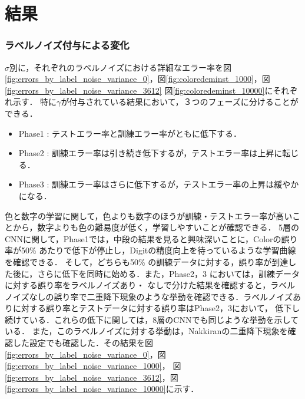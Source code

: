 \chapter{結果}
\label{chap:results}

\subsection{ラベルノイズ付与による変化}
$\sigma$別に，それぞれのラベルノイズにおける詳細なエラー率を図\ref{fig:errors_by_label_noise_variance_0}，図\ref{fig:coloredeminst_1000}，図\ref{fig:errors_by_label_noise_variance_3612}
図\ref{fig:coloredeminst_10000}にそれぞれ示す．
特に$\gamma$が付与されている結果において，３つのフェーズに分けることができる．
\begin{itemize}
    \item Phase1 : テストエラー率と訓練エラー率がともに低下する．
    \item Phase2 : 訓練エラー率は引き続き低下するが，テストエラー率は上昇に転じる．
    \item Phase3 : 訓練エラー率はさらに低下するが，テストエラー率の上昇は緩やかになる．
\end{itemize}
色と数字の学習に関して，色よりも数字のほうが訓練・テストエラー率が高いことから，数字よりも色の難易度が低く，学習しやすいことが確認できる．
5層のCNNに関して，Phase1では，中段の結果を見ると興味深いことに，Colorの誤り率が50\% あたりで低下が停止し，Digitの精度向上を待っているような学習曲線を確認できる．
そして，どちらも50\% の訓練データに対する，誤り率が到達した後に，さらに低下を同時に始める．また，Phase2，3 においては，訓練データに対する誤り率をラベルノイズあり・
なしで分けた結果を確認すると，ラベルノイズなしの誤り率で二重降下現象のような挙動を確認できる．ラベルノイズありに対する誤り率とテストデータに対する誤り率はPhase2，3において，
低下し続けている．これらの低下に関しては，8層のCNNでも同じような挙動を示している．
また，このラベルノイズに対する挙動は，Nakkiranの二重降下現象を確認した設定でも確認した．その結果を図\ref{fig:errors_by_label_noise_variance_0}，図\ref{fig:errors_by_label_noise_variance_1000}，
図\ref{fig:errors_by_label_noise_variance_3612}，図\ref{fig:errors_by_label_noise_variance_10000}に示す．
